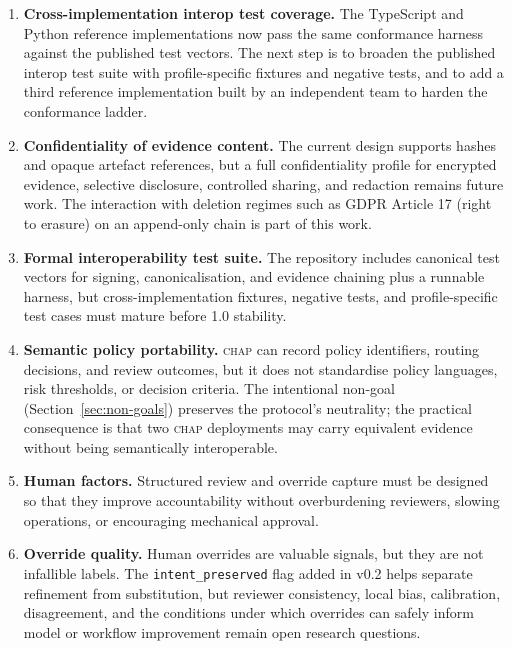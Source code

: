 \documentclass[11pt]{article}
\newcommand{\chap}{\textsc{chap}}
\begin{document}
\begin{enumerate}[leftmargin=*]
    \item \textbf{Cross-implementation interop test coverage.} The TypeScript and Python reference implementations now pass the same conformance harness against the published test vectors. The next step is to broaden the published interop test suite with profile-specific fixtures and negative tests, and to add a third reference implementation built by an independent team to harden the conformance ladder.

    \item \textbf{Confidentiality of evidence content.} The current design supports hashes and opaque artefact references, but a full confidentiality profile for encrypted evidence, selective disclosure, controlled sharing, and redaction remains future work. The interaction with deletion regimes such as GDPR Article 17 (right to erasure) on an append-only chain is part of this work.

    \item \textbf{Formal interoperability test suite.} The repository includes canonical test vectors for signing, canonicalisation, and evidence chaining plus a runnable harness, but cross-implementation fixtures, negative tests, and profile-specific test cases must mature before 1.0 stability.

    \item \textbf{Semantic policy portability.} \chap{} can record policy identifiers, routing decisions, and review outcomes, but it does not standardise policy languages, risk thresholds, or decision criteria. The intentional non-goal (Section~\ref{sec:non-goals}) preserves the protocol's neutrality; the practical consequence is that two \chap{} deployments may carry equivalent evidence without being semantically interoperable.

    \item \textbf{Human factors.} Structured review and override capture must be designed so that they improve accountability without overburdening reviewers, slowing operations, or encouraging mechanical approval.

    \item \textbf{Override quality.} Human overrides are valuable signals, but they are not infallible labels. The \texttt{intent\_preserved} flag added in v0.2 helps separate refinement from substitution, but reviewer consistency, local bias, calibration, disagreement, and the conditions under which overrides can safely inform model or workflow improvement remain open research questions.


\end{enumerate}
\end{document}
